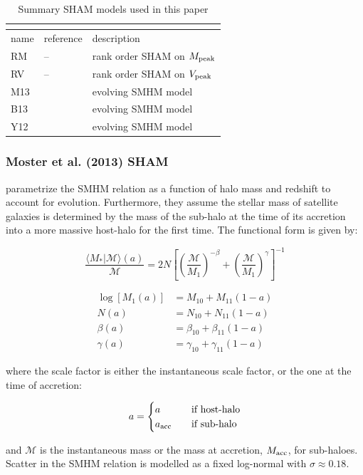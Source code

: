 \documentclass[a4paper,fleqn,usenatbib]{mnras}
\begin{document}
\begin{table}
\label{table:models}
\caption{Summary SHAM models used in this paper}
\begin{tabular}{ |p{0.55cm}|p{3cm}|p{3.65cm}}
\multicolumn{3}{|c|}{} \\
\hline
name & reference & description  \\
\hline
\hline
RM &  -- & rank order SHAM on $M_{\rm peak}$ \\
RV & -- & rank order SHAM on $V_{\rm peak}$ \\
M13 & \citet{Moster:2013ab} & evolving SMHM model \\
B13 & \citet{Behroozi:2013fg} & evolving SMHM model \\
Y12 & \citet{Yang:2012ew} & evolving SMHM model \\
\hline
\end{tabular}
\end{table}

\subsubsection{Moster et al. (2013) SHAM}
\label{sec:m13}

\cite{Moster:2013ab} parametrize the SMHM relation as a function of halo mass and redshift to account for evolution.  Furthermore, they assume the stellar mass of satellite galaxies is determined by the mass of the sub-halo at the time of its accretion into a more massive host-halo for the first time.  The functional form is given by:
%
\begin{linenomath}
\begin{equation}
\label{eq:moster_smhm}
\frac{\langle M_{*} | \mathcal{M}\rangle(a)}{\mathcal{M}} = 2N\left[ \left(\frac{\mathcal{M}}{{M}_1} \right)^{-\beta} + \left( \frac{\mathcal{M}}{{M}_1} \right)^{\gamma} \right]^{-1}
\end{equation}
%
\end{linenomath}
%
\begin{linenomath}
\begin{align}
\label{eq:smhm_params}
\log[{M}_1(a)]& = {M}_{10} + {M}_{11}(1-a) \\
N(a) &= N_{10} + N_{11}(1-a) \\
\beta(a) &= \beta_{10} + \beta_{11}(1-a) \\ 
\gamma(a) &=  \gamma_{10} + \gamma_{11}(1-a)
\end{align}
\end{linenomath}
%
where the scale factor is either the instantaneous scale factor, or the one at the time of accretion:
%
\begin{linenomath}
\begin{equation}
a = 
\begin{cases}
    a      & \quad \text{if host-halo}\\
    a_{\rm acc}  & \quad \text{if sub-halo} \\
  \end{cases}
\end{equation}
\end{linenomath}
%
and $\mathcal{M}$ is the instantaneous mass or the mass at accretion, $M_{\rm acc}$, for sub-haloes.  Scatter in the SMHM relation is modelled as a fixed log-normal with $\sigma \approx 0.18$.
\end{document}
